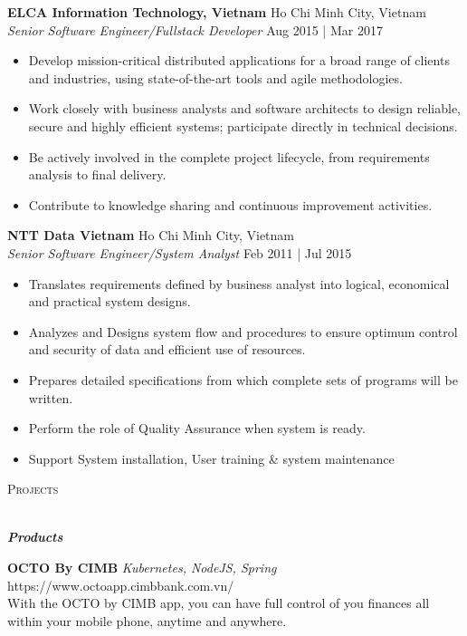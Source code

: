 \documentclass[a4paper]{article}
\newcommand{\lineunder} {
    \vspace*{-8pt} \\
    \hspace*{-18pt} \hrulefill \\
}
\newcommand{\header} [1] {
    {\hspace*{-18pt}\vspace*{6pt} \textsc{#1}}
    \vspace*{-6pt} \lineunder
}
\begin{document}
\textbf{ELCA Information Technology, Vietnam} \hfill Ho Chi Minh City, Vietnam\\
\textit{Senior Software Engineer/Fullstack Developer} \hfill Aug 2015 | Mar 2017\\
\vspace{-1mm}
\begin{itemize} \itemsep 1pt
	\item Develop mission-critical distributed applications for a broad range of clients and industries, using state-of-the-art tools and agile methodologies.
	\item Work closely with business analysts and software architects to design reliable, secure and highly efficient systems; participate directly in technical decisions.
	\item Be actively involved in the complete project lifecycle, from requirements analysis to final delivery.
	\item Contribute to knowledge sharing and continuous improvement activities.
\end{itemize}

\newpage
\textbf{NTT Data Vietnam} \hfill Ho Chi Minh City, Vietnam\\
\textit{Senior Software Engineer/System Analyst} \hfill Feb 2011 | Jul 2015\\
\vspace{-1mm}
\begin{itemize} \itemsep 1pt
	\item Translates requirements defined by business analyst into logical, economical and practical system designs.
	\item Analyzes and Designs system flow and procedures to ensure optimum control and security of data and efficient use of resources.
	\item Prepares detailed specifications from which complete sets of programs will be written.
	\item Perform the role of Quality Assurance when system is ready.
	\item Support System installation, User training \& system maintenance
\end{itemize}

\header{Projects}
\begin{center}
	\textbf{\textit{Products}}
\end{center}

{\textbf{OCTO By CIMB}} {\sl Kubernetes, NodeJS, Spring} \hfill https://www.octoapp.cimbbank.com.vn/\\
With the OCTO by CIMB app, you can have full control of you finances all within your mobile phone, anytime and anywhere.\\
\vspace*{2mm}
\end{document}
